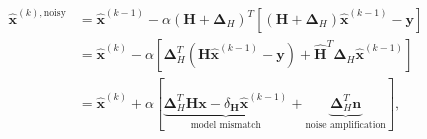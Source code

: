 \begin{align}
\bm{\hat{x}}^{(k),\text{noisy}} &= \bm{\hat{x}}^{(k-1)} - \alpha (\bm{H}+\bm{\Delta}_H)^T  \left[(\bm{H}+\bm{\Delta}_H)\bm{\hat{x}}^{(k-1)} -\bm{y}\right] \nonumber\\
    &= \bm{\hat{x}}^{(k)} - \alpha \left[ \bm{\Delta}_H^T( \bm{H}\bm{\hat{x}}^{(k-1)} - \bm{y}) + \bm{\hat{H}}^T\bm{\Delta}_H \bm{\hat{x}}^{(k-1)} \right] \nonumber \\
    &= \bm{\hat{x}}^{(k)} + \alpha \left[\underbrace{ \bm{\Delta}_H^T\bm{H} \bm{x} - \delta_{\bm{H}} \bm{\hat{x}}^{(k-1)}}_{\text{model mismatch}}  + \underbrace{\bm{\Delta}_H^T \bm{n}}_{\text{noise amplification}} \right], \label{eq:gradient_descent_mismatch_app}

\end{align}

